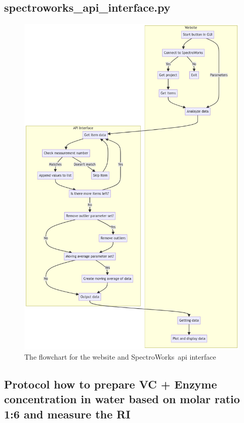 \documentclass{article}
\begin{document}
\subsection{spectroworks\_api\_interface.py}\label{appendix:api_interface}
\begin{figure}[H]
    \centering
    \includegraphics[width=\textwidth]{flowchart_api_white.png}
    \caption{The flowchart for the website and SpectroWorks\texttrademark\ api interface}
    \label{fig:flowchart_api}
\end{figure}

\subsection{Protocol how to prepare VC + Enzyme concentration in water based on molar ratio 1:6 and measure the RI}\label{appendix:protocol_vc}

\end{document}
